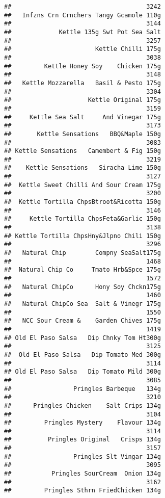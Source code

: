 \documentclass[
]{article}
\begin{document}
\begin{verbatim}
##                                     3242 
##   Infzns Crn Crnchers Tangy Gcamole 110g 
##                                     3144 
##             Kettle 135g Swt Pot Sea Salt 
##                                     3257 
##                       Kettle Chilli 175g 
##                                     3038 
##         Kettle Honey Soy    Chicken 175g 
##                                     3148 
##   Kettle Mozzarella   Basil & Pesto 175g 
##                                     3304 
##                     Kettle Original 175g 
##                                     3159 
##     Kettle Sea Salt     And Vinegar 175g 
##                                     3173 
##       Kettle Sensations   BBQ&Maple 150g 
##                                     3083 
## Kettle Sensations   Camembert & Fig 150g 
##                                     3219 
##    Kettle Sensations   Siracha Lime 150g 
##                                     3127 
##  Kettle Sweet Chilli And Sour Cream 175g 
##                                     3200 
##  Kettle Tortilla ChpsBtroot&Ricotta 150g 
##                                     3146 
##     Kettle Tortilla ChpsFeta&Garlic 150g 
##                                     3138 
## Kettle Tortilla ChpsHny&Jlpno Chili 150g 
##                                     3296 
##   Natural Chip        Compny SeaSalt175g 
##                                     1468 
##  Natural Chip Co     Tmato Hrb&Spce 175g 
##                                     1572 
##   Natural ChipCo      Hony Soy Chckn175g 
##                                     1460 
##   Natural ChipCo Sea  Salt & Vinegr 175g 
##                                     1550 
##   NCC Sour Cream &    Garden Chives 175g 
##                                     1419 
## Old El Paso Salsa   Dip Chnky Tom Ht300g 
##                                     3125 
##  Old El Paso Salsa   Dip Tomato Med 300g 
##                                     3114 
## Old El Paso Salsa   Dip Tomato Mild 300g 
##                                     3085 
##                 Pringles Barbeque   134g 
##                                     3210 
##      Pringles Chicken    Salt Crips 134g 
##                                     3104 
##         Pringles Mystery    Flavour 134g 
##                                     3114 
##          Pringles Original   Crisps 134g 
##                                     3157 
##                 Pringles Slt Vingar 134g 
##                                     3095 
##           Pringles SourCream  Onion 134g 
##                                     3162 
##         Pringles Sthrn FriedChicken 134g 

\end{verbatim}
\end{document}
